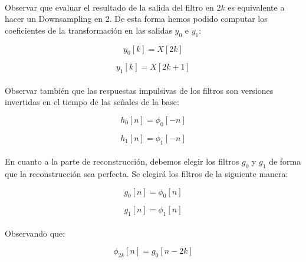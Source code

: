 \paragraph{}
Observar que evaluar el resultado de la salida del filtro en $2k$ es equivalente a hacer un Downsampling en 2. De esta forma hemos podido computar los coeficientes de la transformación en las salidas $y_{0}$ e $y_{1}$:

\begin{equation}
  y_{0}[k] = X[2k]
\end{equation}

\begin{equation}
  y_{1}[k] = X[2k + 1]
\end{equation}

\paragraph{}
Observar también que las respuestas impulsivas de los filtros son versiones invertidas en el tiempo de las señales de la base:

\begin{equation}
  h_{0}[n] = \phi_{0}[-n]
\end{equation}

\begin{equation}
  h_{1}[n] = \phi_{1}[-n]
\end{equation}

\paragraph{}
En cuanto a la parte de reconstrucción, debemos elegir los filtros $g_{0}$ y $g_{1}$ de forma que la reconstrucción sea perfecta. Se elegirá los filtros de la siguiente manera:

\begin{equation}
  g_{0}[n] = \phi_{0}[n]
\end{equation}

\begin{equation}
  g_{1}[n] = \phi_{1}[n]
\end{equation}

\paragraph{}
Observando que:

\begin{equation}
  \phi_{2k}[n] = g_{0}[n - 2k]
\end{equation}


